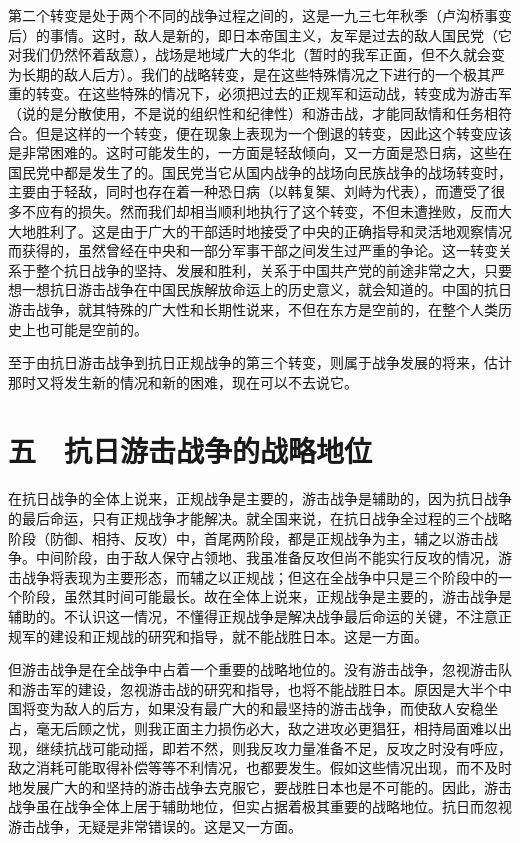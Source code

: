 第二个转变是处于两个不同的战争过程之间的，这是一九三七年秋季（卢沟桥事变后）的事情。这时，敌人是新的，即日本帝国主义，友军是过去的敌人国民党（它对我们仍然怀着敌意），战场是地域广大的华北（暂时的我军正面，但不久就会变为长期的敌人后方）。我们的战略转变，是在这些特殊情况之下进行的一个极其严重的转变。在这些特殊的情况下，必须把过去的正规军和运动战，转变成为游击军（说的是分散使用，不是说的组织性和纪律性）和游击战，才能同敌情和任务相符合。但是这样的一个转变，便在现象上表现为一个倒退的转变，因此这个转变应该是非常困难的。这时可能发生的，一方面是轻敌倾向，又一方面是恐日病，这些在国民党中都是发生了的。国民党当它从国内战争的战场向民族战争的战场转变时，主要由于轻敌，同时也存在着一种恐日病（以韩复榘、刘峙为代表），而遭受了很多不应有的损失。然而我们却相当顺利地执行了这个转变，不但未遭挫败，反而大大地胜利了。这是由于广大的干部适时地接受了中央的正确指导和灵活地观察情况而获得的，虽然曾经在中央和一部分军事干部之间发生过严重的争论。这一转变关系于整个抗日战争的坚持、发展和胜利，关系于中国共产党的前途非常之大，只要想一想抗日游击战争在中国民族解放命运上的历史意义，就会知道的。中国的抗日游击战争，就其特殊的广大性和长期性说来，不但在东方是空前的，在整个人类历史上也可能是空前的。

至于由抗日游击战争到抗日正规战争的第三个转变，则属于战争发展的将来，估计那时又将发生新的情况和新的困难，现在可以不去说它。

\section{五　抗日游击战争的战略地位}

在抗日战争的全体上说来，正规战争是主要的，游击战争是辅助的，因为抗日战争的最后命运，只有正规战争才能解决。就全国来说，在抗日战争全过程的三个战略阶段（防御、相持、反攻）中，首尾两阶段，都是正规战争为主，辅之以游击战争。中间阶段，由于敌人保守占领地、我虽准备反攻但尚不能实行反攻的情况，游击战争将表现为主要形态，而辅之以正规战；但这在全战争中只是三个阶段中的一个阶段，虽然其时间可能最长。故在全体上说来，正规战争是主要的，游击战争是辅助的。不认识这一情况，不懂得正规战争是解决战争最后命运的关键，不注意正规军的建设和正规战的研究和指导，就不能战胜日本。这是一方面。

但游击战争是在全战争中占着一个重要的战略地位的。没有游击战争，忽视游击队和游击军的建设，忽视游击战的研究和指导，也将不能战胜日本。原因是大半个中国将变为敌人的后方，如果没有最广大的和最坚持的游击战争，而使敌人安稳坐占，毫无后顾之忧，则我正面主力损伤必大，敌之进攻必更猖狂，相持局面难以出现，继续抗战可能动摇，即若不然，则我反攻力量准备不足，反攻之时没有呼应，敌之消耗可能取得补偿等等不利情况，也都要发生。假如这些情况出现，而不及时地发展广大的和坚持的游击战争去克服它，要战胜日本也是不可能的。因此，游击战争虽在战争全体上居于辅助地位，但实占据着极其重要的战略地位。抗日而忽视游击战争，无疑是非常错误的。这是又一方面。

